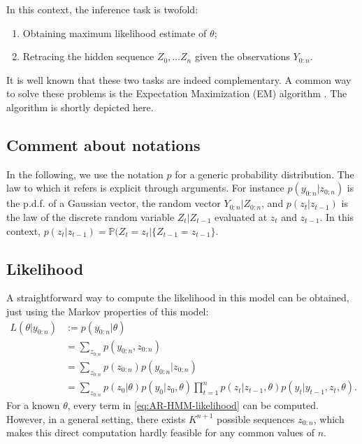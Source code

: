 \documentclass[]{book}
\providecommand{\tightlist}{%
  \setlength{\itemsep}{0pt}\setlength{\parskip}{0pt}}
\begin{document}
In this context, the inference task is twofold:

\begin{enumerate}
\def\labelenumi{\arabic{enumi}.}
\tightlist
\item
  Obtaining maximum likelihood estimate of \(\theta\);
\item
  Retracing the hidden sequence \(Z_0,\dots Z_n\) given the observations \(Y_{0:n}\).
\end{enumerate}

It is well known that these two tasks are indeed complementary.
A common way to solve these problems is the Expectation Maximization (EM) algorithm
\citep{dempster1977maximum}.
The algorithm is shortly depicted here.

\hypertarget{comment-about-notations}{%
\subsection*{Comment about notations}\label{comment-about-notations}}

In the following, we use the notation \(p\) for a generic probability distribution. The law to which it refers is explicit through arguments. For instance \(p(y_{0:n} \vert z_{0:n})\) is the p.d.f. of a Gaussian vector, the random vector \(Y_{0:n}\vert Z_{0:n}\), and \(p(z_t\vert z_{t - 1})\) is the law of the discrete random variable \(Z_{t} \vert Z_{t - 1}\) evaluated at \(z_t\) and \(z_{t -1}\).
In this context, \(p(z_t\vert z_{t - 1}) = \mathbb{P}(Z_t = z_t \vert \lbrace Z_{t-1} = z_{t -1}\rbrace.\)

\hypertarget{likelihood}{%
\subsection{Likelihood}\label{likelihood}}

A straightforward way to compute the likelihood in this model can be obtained, just using the Markov properties of this model:
\begin{align}
L(\theta \vert y_{0:n}) &:= p(y_{0:n} \vert \theta) \nonumber \\
&= \sum_{z_{0:n}} p(y_{0:n}, z_{0:n}) \nonumber \\
&= \sum_{z_{0:n}} p(z_{0:n})p(y_{0:n}\vert z_{0:n}) \nonumber \\
&=  \sum_{z_{0:n}} p(z_0 \vert \theta) p(y_0\vert z_0, \theta) \prod_{t = 1}^n p(z_{t} \vert z_{t - 1}, \theta)p(y_{t}\vert y_{t -1}, z_{t}, \theta)  \label{eq:AR-HMM-likelihood}.
\end{align}
For a known \(\theta\), every term in \eqref{eq:AR-HMM-likelihood} can be computed.
However, in a general setting, there exists \(K^{n + 1}\) possible sequences \(z_{0:n}\), which makes this direct computation hardly feasible for any common values of \(n\).
\end{document}

